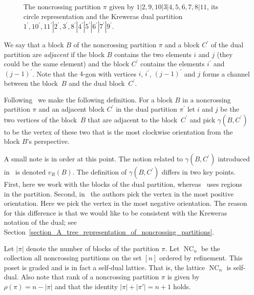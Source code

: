 \documentclass[11pt]{amsart}
\numberwithin{equation}{section}
\DeclareMathOperator{\NC}{NC}
\begin{document}
\begin{figure}
\begin{center}
\end{center}
\caption{The noncrossing partition $\pi$ given by
$1|2,9,10|3|4,5,6,7,8|11$,
its circle representation
and the Kreweras dual partition
$1^{\prime},10^{\prime},11^{\prime}|2^{\prime},3^{\prime},8^{\prime}|4^{\prime}|5^{\prime}|6^{\prime}|7^{\prime}|9^{\prime}$.
}
\label{figure_example_noncrossing_partition}
\end{figure}


We say that a block $B$ of the noncrossing partition $\pi$ and
a block $C^{\prime}$ of the dual partition are {\em adjacent}
if the block $B$ contains the two elements $i$ and $j$
(they could be the same element)
and the block $C^{\prime}$
contains the elements
$i^{\prime}$
and
$(j-1)^{\prime}$.
Note that the $4$-gon
with vertices
$i$, $i^{\prime}$, $(j-1)^{\prime}$ and $j$
forms a channel between the block~$B$ and the dual block~$C^{\prime}$.

Following~\cite[Definitions~3.1 and~3.2]{Ehrenborg_Happ}
we make the following definition.
For a block $B$ in a noncrossing partition $\pi$ and
an adjacent block $C^{\prime}$ in the dual partition $\pi^{\prime}$
let $i$ and $j$ be the two vertices of the block~$B$
that are adjacent to the block~$C^{\prime}$
and pick
$\gamma(B,C^{\prime})$ to be the vertex
of these two that is the most
clockwise orientation from the block $B$'s perspective.

A small note is in order at this point.
The notion related to $\gamma(B,C^{\prime})$ introduced
in~\cite{Ehrenborg_Happ} is denoted $v_{R}(B)$. The
definition of $\gamma(B,C^{\prime})$  differs in two key points. 
First, here we work with the blocks of the dual partition,
whereas~\cite{Ehrenborg_Happ} uses regions in the partition. Second,
in~\cite{Ehrenborg_Happ} the authors pick the vertex
in the most positive orientation. Here we pick the vertex in the most
negative orientation. The reason for this difference is that
we would like to be consistent with the Kreweras notation of the dual;
see Section~\ref{section_A_tree_representation_of_noncrossing_partitions}.


Let $|\pi|$ denote the number of blocks of the partition $\pi$.
Let $\NC_{n}$ be the collection all noncrossing partitions on the set $[n]$
ordered by refinement. This poset is graded and is in fact a self-dual lattice.
That is, the lattice $\NC_{n}$ is self-dual.
Also note that rank of a noncrossing partition $\pi$ is given by
$\rho(\pi) = n - |\pi|$
and that the identity $|\pi| + |\pi'| = n+1$ holds.
\end{document}
